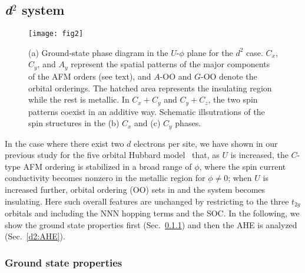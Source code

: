 \documentclass[aps,twocolumn,prb,preprintnumbers,amsmath,amssymb]{revtex4-2}
\begin{document}
\subsection{\textit{\textbf{d}}$^2$ system}\label{d2}
\begin{figure}
\begin{center}
\texttt{[image: fig2]}
\end{center}
\caption{
(a) Ground-state phase diagram in the $U$-$\phi$ plane for the $d^2$ case. 
$C_x$, $C_y$, and $A_y$ represent the spatial patterns of the major components of the AFM orders (see text),
 and $A$-OO and $G$-OO denote the orbital orderings.
The hatched area represents the insulating region while the rest is metallic. 
In $C_x + C_y$ and $C_y + C_z$, the two spin patterns coexist in an additive way. 
Schematic illsutrations of the spin structures in the (b) $C_x$ and (c) $C_y$ phases.
}
\label{fig2}
\end{figure}

In the case where there exist two $d$ electrons per site, 
 we have shown in our previous study for the five orbital Hubbard model~\cite{naka3} that, as $U$ is increased, 
 the $C$-type AFM ordering is stabilized in a broad range of $\phi$, 
 where the spin current conductivity becomes nonzero in the metallic region for $\phi \neq 0$; 
 when $U$ is increased further, orbital ordering (OO) sets in and the system becomes insulating. 
Here such overall features are unchanged by restricting to the three $t_{2g}$ orbitals and including the NNN hopping terms and the SOC. 
In the following, we show the ground state properties first (Sec.~\ref{d2:groundstate}) and then the AHE is analyzed (Sec.~\ref{d2:AHE}). 

\subsubsection{Ground state properties}\label{d2:groundstate}
\end{document}
